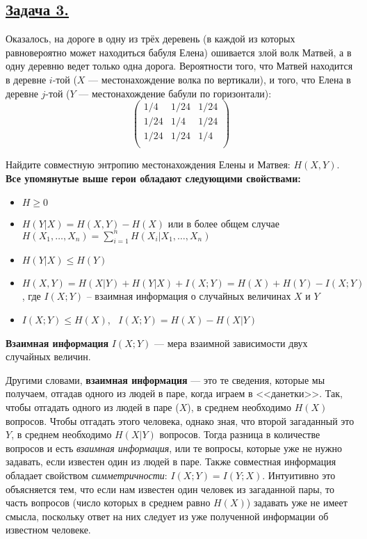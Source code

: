 \subsection*{\hyperref[sec:sol_problem3]{Задача 3.}}\label{sec:problem3} Оказалось, на дороге в одну из трёх деревень (в каждой из которых равновероятно может находиться бабуля Елена) ошивается злой волк Матвей, а в одну деревню ведет только одна дорога. Вероятности того, что Матвей находится в деревне $i$-той ($X$ --- местонахождение волка по вертикали), и того, что Елена в деревне $j$-той ($Y$ --- местонахождение бабули по горизонтали):
\[\begin{pmatrix}
    1/4 & 1/24 & 1/24 \\
    1/24 & 1/4 & 1/24 \\
    1/24 & 1/24 & 1/4 \\
\end{pmatrix} \]

Найдите совместную энтропию местонахождения Елены и Матвея: $H(X, Y)$. \\

\textbf{Все упомянутые выше герои обладают следующими свойствами:}

\begin{itemize}
    \item $H \geqslant 0$
    \item $H(Y|X)=H(X, Y)-H(X)$ или в более общем случае $H(X_1, \ldots, X_n)=\sum\limits_{i=1}^n H(X_i|X_1, \ldots, X_n)$
    \item $H(Y|X)\leqslant H(Y)$
    \item $H(X, Y)=H(X|Y)+H(Y|X)+I(X; Y)=H(X)+H(Y)-I(X; Y)$, где $I(X; Y)$ -- взаимная информация о случайных величинах $X$ и $Y$
    \item $I(X; Y)\leqslant H(X)$, \ $I(X; Y)=H(X)-H(X|Y)$
\end{itemize}

\begin{siderules}
    \textbf{Взаимная информация} $I(X; Y)$ --- мера взаимной зависимости двух случайных величин.
\end{siderules}

Другими словами, \textbf{взаимная информация} --- это те сведения, которые мы получаем, отгадав одного из людей в паре, когда играем в <<данетки>>. Так, чтобы отгадать одного из людей в паре ($X$), в среднем необходимо $H(X)$ вопросов. Чтобы отгадать этого человека, однако зная, что второй загаданный это $Y$, в среднем необходимо $H(X|Y)$ вопросов. Тогда разница в количестве вопросов и есть \textit{взаимная информация}, или те вопросы, которые уже не нужно задавать, если известен один из людей в паре. Также совместная информация обладает свойством \textit{симметричности}: $I(X;Y)=I(Y;X)$. Интуитивно это объясняется тем, что если нам известен один человек из загаданной пары, то часть вопросов (число которых в среднем равно $H(X)$) задавать уже не имеет смысла, поскольку ответ на них следует из уже полученной информации об известном человеке. 

